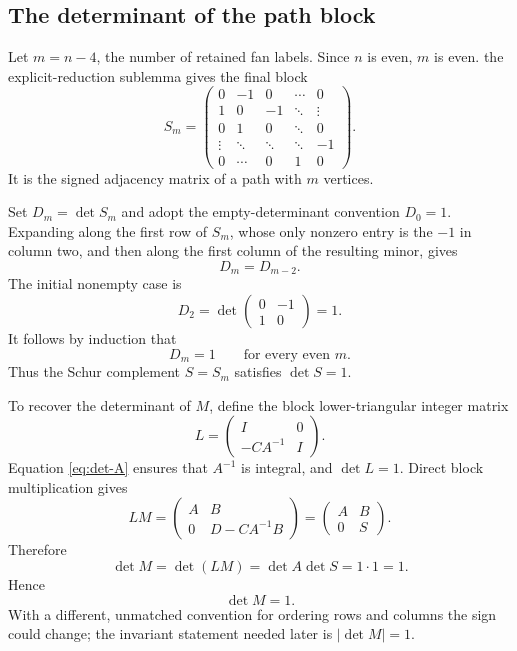 \documentclass[11pt]{article}
\theoremstyle{definition}
\begin{document}
\subsection{The determinant of the path block}

Let $m=n-4$, the number of retained fan labels.  Since $n$ is even, $m$ is
even.  the explicit-reduction sublemma gives the final block
\begin{equation}\label{eq:path-matrix}
S_m=
\begin{pmatrix}
0&-1&0&\cdots&0\\
1&0&-1&\ddots&\vdots\\
0&1&0&\ddots&0\\
\vdots&\ddots&\ddots&\ddots&-1\\
0&\cdots&0&1&0
\end{pmatrix}.
\end{equation}
It is the signed adjacency matrix of a path with $m$ vertices.

Set $D_m=\det S_m$ and adopt the empty-determinant convention $D_0=1$.
Expanding along the first row of $S_m$, whose only nonzero entry is the
$-1$ in column two, and then along the first column of the resulting minor,
gives
\begin{equation}\label{eq:det-recurrence}
 D_m=D_{m-2}.
\end{equation}
The initial nonempty case is
\[
 D_2=\det\begin{pmatrix}0&-1\\1&0\end{pmatrix}=1.
\]
It follows by induction that
\[
 D_m=1\qquad\text{for every even }m.
\]
Thus the Schur complement $S=S_m$ satisfies $\det S=1$.

To recover the determinant of $M$, define the block lower-triangular integer
matrix
\[
 L=\begin{pmatrix}I&0\\-CA^{-1}&I\end{pmatrix}.
\]
Equation \eqref{eq:det-A} ensures that $A^{-1}$ is integral, and
$\det L=1$.  Direct block multiplication gives
\[
 LM=
 \begin{pmatrix}
 A&B\\
 0&D-CA^{-1}B
 \end{pmatrix}
 =\begin{pmatrix}A&B\\0&S\end{pmatrix}.
\]
Therefore
\[
 \det M=\det(LM)=\det A\det S=1\cdot1=1.
\]
Hence
\begin{equation}\label{eq:detM}
 \boxed{\det M=1.}
\end{equation}
With a different, unmatched convention for ordering rows and columns the sign
could change; the invariant statement needed later is $|\det M|=1$.
\end{document}

